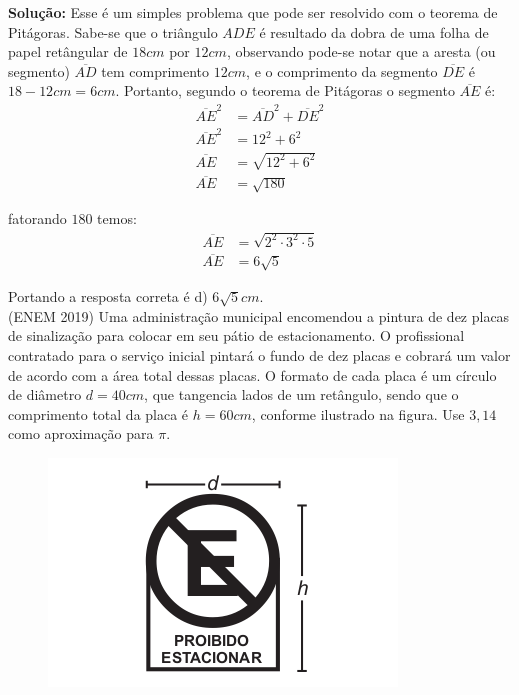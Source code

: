 \begin{multicols*}{2}
    \noindent \textbf{Solução:} 
    Esse é um simples problema que pode ser resolvido com o teorema de Pitágoras.
    Sabe-se que o triângulo $ADE$ é resultado da dobra de uma folha de papel retângular
    de $18 cm$ por $12 cm$, observando pode-se notar que a aresta (ou segmento) 
    $\overline{AD}$ tem comprimento $12cm$, e o comprimento da segmento $\overline{DE}$
    é $18-12 cm = 6cm$. Portanto, segundo o teorema de Pitágoras o segmento 
    $\overline{AE}$ é:
    \begin{align}
        \overline{AE}^2 &= \overline{AD}^2 + \overline{DE}^2\\
        \overline{AE}^2 &= 12^2 + 6^2\\
        \overline{AE} &= \sqrt{12^2+6^2}\\
        \overline{AE} &= \sqrt{180}
    \end{align}
    
    \noindent fatorando $180$ temos:
    \begin{align}
        \overline{AE} &= \sqrt{2^2\cdot 3^2\cdot 5}\\
        \overline{AE} &= 6\sqrt{5}
    \end{align}

    \noindent Portando a resposta correta é d) $6\sqrt{5}cm$.\\


    \noindent 
    \execnum (ENEM 2019) Uma administração municipal encomendou a pintura
    de dez placas de sinalização para colocar em seu pátio
    de estacionamento.
    O profissional contratado para o serviço inicial
    pintará o fundo de dez placas e cobrará um valor de
    acordo com a área total dessas placas. O formato
    de cada placa é um círculo de diâmetro $d = 40 cm$,
    que tangencia lados de um retângulo, sendo que
    o comprimento total da placa é $h = 60 cm$, conforme
    ilustrado na figura. Use $3,14$ como aproximação para $\pi$.

    \begin{figure}[H]
        \includegraphics[width=\columnwidth]{assets/enem2019-151.png}
    \end{figure}


\end{multicols*}
